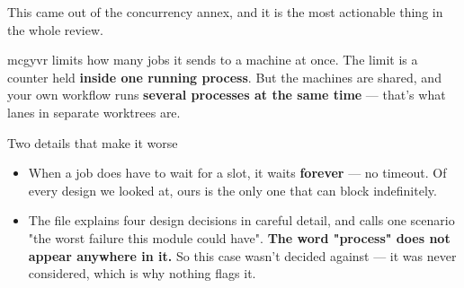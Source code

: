\documentclass[11pt]{article}
\newcommand{\shout}[1]{\textbf{#1}}
\begin{document}
This came out of the concurrency annex, and it is the most actionable thing in
the whole review.

mcgyvr limits how many jobs it sends to a machine at once. The limit is a counter
held \shout{inside one running process}. But the machines are shared, and your own
workflow runs \shout{several processes at the same time} --- that's what lanes in
separate worktrees are.

\begin{center}
\end{center}

\begin{badbox}{Two details that make it worse}
\begin{itemize}[leftmargin=14pt, itemsep=3pt]
  \item When a job does have to wait for a slot, it waits \shout{forever} --- no
        timeout. Of every design we looked at, ours is the only one that can
        block indefinitely.
  \item The file explains four design decisions in careful detail, and calls one
        scenario "the worst failure this module could have". \shout{The word
        "process" does not appear anywhere in it.} So this case wasn't decided
        against --- it was never considered, which is why nothing flags it.
\end{itemize}
\end{badbox}
\end{document}
